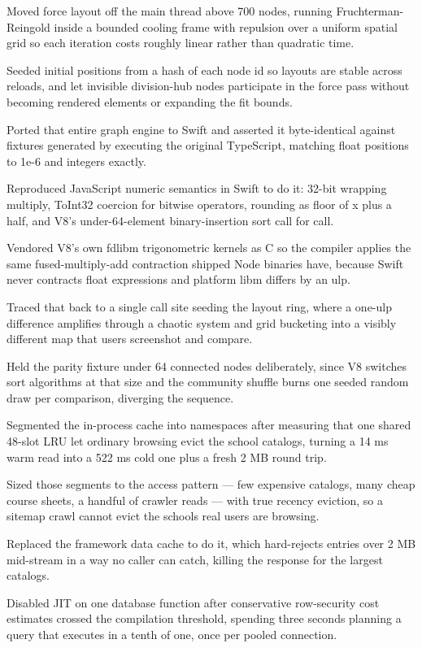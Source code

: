 \documentclass[letterpaper,11pt]{article}
\newcommand{\resumeItem}[1]{
  \item\small{
    {#1 \vspace{-2pt}}
  }
}
\begin{document}
            \resumeItem{Moved force layout off the main thread above 700 nodes, running Fruchterman-Reingold inside a bounded cooling frame with repulsion over a uniform spatial grid so each iteration costs roughly linear rather than quadratic time.}
            \resumeItem{Seeded initial positions from a hash of each node id so layouts are stable across reloads, and let invisible division-hub nodes participate in the force pass without becoming rendered elements or expanding the fit bounds.}
            \resumeItem{Ported that entire graph engine to Swift and asserted it byte-identical against fixtures generated by executing the original TypeScript, matching float positions to 1e-6 and integers exactly.}
            \resumeItem{Reproduced JavaScript numeric semantics in Swift to do it: 32-bit wrapping multiply, ToInt32 coercion for bitwise operators, rounding as floor of x plus a half, and V8's under-64-element binary-insertion sort call for call.}
            \resumeItem{Vendored V8's own fdlibm trigonometric kernels as C so the compiler applies the same fused-multiply-add contraction shipped Node binaries have, because Swift never contracts float expressions and platform libm differs by an ulp.}
            \resumeItem{Traced that back to a single call site seeding the layout ring, where a one-ulp difference amplifies through a chaotic system and grid bucketing into a visibly different map that users screenshot and compare.}
            \resumeItem{Held the parity fixture under 64 connected nodes deliberately, since V8 switches sort algorithms at that size and the community shuffle burns one seeded random draw per comparison, diverging the sequence.}
            \resumeItem{Segmented the in-process cache into namespaces after measuring that one shared 48-slot LRU let ordinary browsing evict the school catalogs, turning a 14 ms warm read into a 522 ms cold one plus a fresh 2 MB round trip.}
            \resumeItem{Sized those segments to the access pattern --- few expensive catalogs, many cheap course sheets, a handful of crawler reads --- with true recency eviction, so a sitemap crawl cannot evict the schools real users are browsing.}
            \resumeItem{Replaced the framework data cache to do it, which hard-rejects entries over 2 MB mid-stream in a way no caller can catch, killing the response for the largest catalogs.}
            \resumeItem{Disabled JIT on one database function after conservative row-security cost estimates crossed the compilation threshold, spending three seconds planning a query that executes in a tenth of one, once per pooled connection.}
\end{document}
